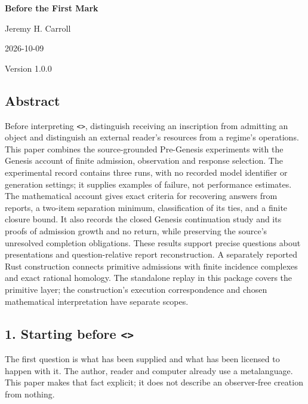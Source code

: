 \documentclass[
  11pt,
]{article}
\author{}
\date{}
\begin{document}
\begin{center}
{\LARGE\bfseries Before the First Mark\par}
Jeremy H. Carroll\par
2026-10-09\par
Version 1.0.0\par
\end{center}

\subsection{Abstract}\label{abstract}

Before interpreting \texttt{\textless{}\textgreater{}}, distinguish
receiving an inscription from admitting an object and distinguish an
external reader's resources from a regime's operations. This paper
combines the source-grounded Pre-Genesis experiments with the Genesis
account of finite admission, observation and response selection. The
experimental record contains three runs, with no recorded model
identifier or generation settings; it supplies examples of failure, not
performance estimates. The mathematical account gives exact criteria for
recovering answers from reports, a two-item separation minimum,
classification of its ties, and a finite closure bound. It also records
the closed Genesis continuation study and its proofs of admission growth
and no return, while preserving the source's unresolved completion
obligations. These results support precise questions about presentations
and question-relative report reconstruction. A separately reported Rust
construction connects primitive admissions with finite incidence
complexes and exact rational homology. The standalone replay in this
package covers the primitive layer; the construction's execution
correspondence and chosen mathematical interpretation have separate
scopes.

\subsection{\texorpdfstring{1. Starting before
\texttt{\textless{}\textgreater{}}}{1. Starting before \textless\textgreater{}}}\label{starting-before}

The first question is what has been supplied and what has been licensed
to happen with it. The author, reader and computer already use a
metalanguage. This paper makes that fact explicit; it does not describe
an observer-free creation from nothing.
\end{document}
